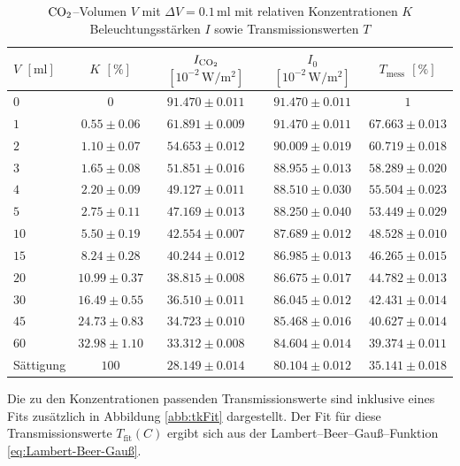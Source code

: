 \documentclass[12pt,a4paper]{scrartcl}
\numberwithin{equation}{section} %
\begin{document}
\begin{table}[h!]
	\centering
	\begin{tabular}{l|c|c|c|c}
		$V$ $[\mathrm{ml}]$
			& $K$ $[\%]$
			& $I_{\ce{CO_2}}$ $[10^{-2} \mathrm{\, W/m^2}]$
			& $I_0$ $[10^{-2} \mathrm{\, W/m^2}]$
			& $T_\mathrm{mess}$ $[\%]$ \\
		\hline
		$0$ & $0$ 							 & $91.470 \pm 0.011$ & $91.470 \pm 0.011$ & $1$ \\
		$1$ & $0.55 \pm 0.06$	  & $61.891 \pm 0.009$ & $91.470 \pm 0.011$ & $67.663 \pm 0.013$ \\
		$2$ & $1.10 \pm 0.07$ 	  & $54.653 \pm 0.012$ & $90.009 \pm 0.019$ & $60.719 \pm 0.018$ \\
		$3$ & $1.65 \pm 0.08$     & $51.851 \pm 0.016$ & $88.955 \pm 0.013$ & $58.289 \pm 0.020$ \\
		$4$ & $2.20 \pm 0.09$     & $49.127 \pm 0.011$ & $88.510 \pm 0.030$ & $55.504 \pm 0.023$ \\
		$5$ & $2.75 \pm 0.11$     & $47.169 \pm 0.013$ & $88.250 \pm 0.040$ & $53.449 \pm 0.029$ \\
		$10$ & $5.50 \pm 0.19$   & $42.554 \pm 0.007$ & $87.689 \pm 0.012$ & $48.528 \pm 0.010$ \\
		$15$ & $8.24 \pm 0.28$   & $40.244 \pm 0.012$ & $86.985 \pm 0.013$ & $46.265 \pm 0.015$ \\
		$20$ & $10.99 \pm 0.37$ & $38.815 \pm 0.008$ & $86.675 \pm 0.017$ & $44.782 \pm 0.013$ \\
		$30$ & $16.49 \pm 0.55$ & $36.510 \pm 0.011$ & $86.045 \pm 0.012$ & $42.431 \pm 0.014$ \\
		$45$ & $24.73 \pm 0.83$ & $34.723 \pm 0.010$ & $85.468 \pm 0.016$ & $40.627 \pm 0.014$ \\
		$60$ & $32.98 \pm 1.10$ & $33.312 \pm 0.008$ & $84.604 \pm 0.014$ & $39.374 \pm 0.011$ \\
		Sättigung & $100$ 			   & $28.149 \pm 0.014$ & $80.104 \pm 0.012$ & $35.141 \pm 0.018$ \\
		\hline
	\end{tabular}
	\caption{$\ce{CO_2}$--Volumen $V$ mit $\Delta V = 0.1 \mathrm{\, ml}$ mit relativen Konzentrationen $K$
		Beleuchtungsstärken $I$ sowie Transmissionswerten $T$}
	\label{table:konzentrationen}
\end{table}

\noindent
Die zu den Konzentrationen passenden Transmissionswerte sind inklusive eines Fits zusätzlich in Abbildung \ref{abb:tkFit} dargestellt. Der Fit für diese Transmissionswerte $T_\mathrm{fit}(C)$ ergibt sich aus der Lambert--Beer--Gauß--Funktion \eqref{eq:Lambert-Beer-Gauß}.
\end{document}
